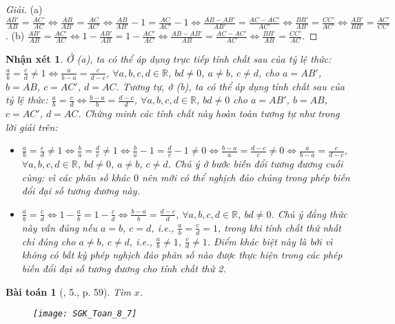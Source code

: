 \documentclass{article}
\newtheorem{baitoan}{Bài toán}
\newtheorem{nhanxet}{Nhận xét}
\begin{document}
\begin{proof}[Giải]
	(a) $\frac{AB'}{AB} = \frac{AC'}{AC}\Leftrightarrow\frac{AB}{AB'} = \frac{AC}{AC'}\Leftrightarrow\frac{AB}{AB'} - 1 = \frac{AC}{AC'} - 1\Leftrightarrow\frac{AB - AB'}{AB'} = \frac{AC - AC'}{AC'}\Leftrightarrow\frac{BB'}{AB'} = \frac{CC'}{AC'}\Leftrightarrow\frac{AB'}{BB'} = \frac{AC'}{CC'}$. (b) $\frac{AB'}{AB} = \frac{AC'}{AC}\Leftrightarrow1 - \frac{AB'}{AB} = 1 - \frac{AC'}{AC}\Leftrightarrow\frac{AB - AB'}{AB} = \frac{AC - AC'}{AC}\Leftrightarrow\frac{BB'}{AB} = \frac{CC'}{AC}$.
\end{proof}

\begin{nhanxet}
	Ở (a), ta có thể áp dụng trực tiếp tính chất sau của tỷ lệ thức: $\frac{a}{b} = \frac{c}{d}\ne1\Leftrightarrow\frac{a}{b - a} = \frac{c}{d - c}$, $\forall a,b,c,d\in\mathbb{R}$, $bd\ne0$, $a\ne b$, $c\ne d$, cho $a = AB'$, $b = AB$, $c = AC'$, $d = AC$. Tương tự, ở (b), ta có thể áp dụng tính chất sau của tỷ lệ thức: $\frac{a}{b} = \frac{c}{d}\Leftrightarrow\frac{b - a}{b} = \frac{d - c}{d}$, $\forall a,b,c,d\in\mathbb{R}$, $bd\ne0$ cho $a = AB'$, $b = AB$, $c = AC'$, $d = AC$. Chứng minh các tính chất này hoàn toàn tương tự như trong lời giải trên:
	\begin{itemize}
		\item $\frac{a}{b} = \frac{c}{d}\ne1\Leftrightarrow\frac{b}{a} = \frac{d}{c}\ne1\Leftrightarrow\frac{b}{a} - 1 = \frac{d}{c} - 1\ne0\Leftrightarrow\frac{b - a}{a} = \frac{d - c}{c}\ne0\Leftrightarrow\frac{a}{b - a} = \frac{c}{d - c}$, $\forall a,b,c,d\in\mathbb{R}$, $bd\ne0$, $a\ne b$, $c\ne d$. Chú ý ở bước biến đổi tương đương cuối cùng: vì các phân số khác $0$ nên mới có thể nghịch đảo chúng trong phép biến đổi đại số tương đương này.
		\item $\frac{a}{b} = \frac{c}{d}\Leftrightarrow1 - \frac{a}{b} = 1 - \frac{c}{d}\Leftrightarrow\frac{b - a}{b} = \frac{d - c}{d}$, $\forall a,b,c,d\in\mathbb{R}$, $bd\ne0$. Chú ý đẳng thức này vẫn đúng nếu $a = b$, $c = d$, i.e., $\frac{a}{b} = \frac{c}{d} = 1$, trong khi tính chất thứ nhất chỉ đúng cho $a\ne b$, $c\ne d$, i.e., $\frac{a}{b}\ne1$, $\frac{c}{d}\ne1$. Điểm khác biệt này là bởi vì không có bất kỳ phép nghịch đảo phân số nào được thực hiện trong các phép biến đổi đại số tương đương cho tính chất thứ 2.
	\end{itemize} 
\end{nhanxet}

\begin{baitoan}[\cite{SGK_Toan_8_tap_2}, 5., p. 59]
	Tìm $x$.
	\begin{figure}[H]
		\centering
		\texttt{[image: SGK\_Toan\_8\_7]}
	\end{figure}
\end{baitoan}
\end{document}
